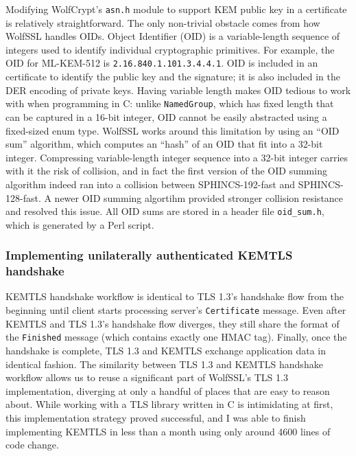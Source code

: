 \documentclass[letterpaper,12pt,titlepage,oneside,final]{book}
\begin{document}
Modifying WolfCrypt's \texttt{asn.h} module to support KEM public key in a certificate is relatively straightforward. The only non-trivial obstacle comes from how WolfSSL handles OIDs. Object Identifier (OID) is a variable-length sequence of integers used to identify individual cryptographic primitives. For example, the OID for ML-KEM-512 is \texttt{2.16.840.1.101.3.4.4.1}. OID is included in an certificate to identify the public key and the signature; it is also included in the DER encoding of private keys. Having variable length makes OID tedious to work with when programming in C: unlike \texttt{NamedGroup}, which has fixed length that can be captured in a 16-bit integer, OID cannot be easily abstracted using a fixed-sized enum type. WolfSSL works around this limitation by using an ``OID sum'' algorithm, which computes an ``hash'' of an OID that fit into a 32-bit integer. Compressing variable-length integer sequence into a 32-bit integer carries with it the risk of collision, and in fact the first version of the OID summing algorithm indeed ran into a collision between SPHINCS-192-fast and SPHINCS-128-fast. A newer OID summing algortihm provided stronger collision resistance and resolved this issue. All OID sums are stored in a header file \texttt{oid\_sum.h}, which is generated by a Perl script.

\subsubsection{Implementing unilaterally authenticated KEMTLS handshake}
KEMTLS handshake workflow is identical to TLS 1.3's handshake flow from the beginning until client starts processing server's \texttt{Certificate} message.
Even after KEMTLS and TLS 1.3's handshake flow diverges, they still share the format of the \texttt{Finished} message (which contains exactly one HMAC tag).
Finally, once the handshake is complete, TLS 1.3 and KEMTLS exchange application data in identical fashion.
The similarity between TLS 1.3 and KEMTLS handshake workflow allows us to reuse a significant part of WolfSSL's TLS 1.3 implementation, diverging at only a handful of places that are easy to reason about.
While working with a TLS library written in C is intimidating at first, this implementation strategy proved successful, and I was able to finish implementing KEMTLS in less than a month using only around 4600 lines of code change.
\end{document}

